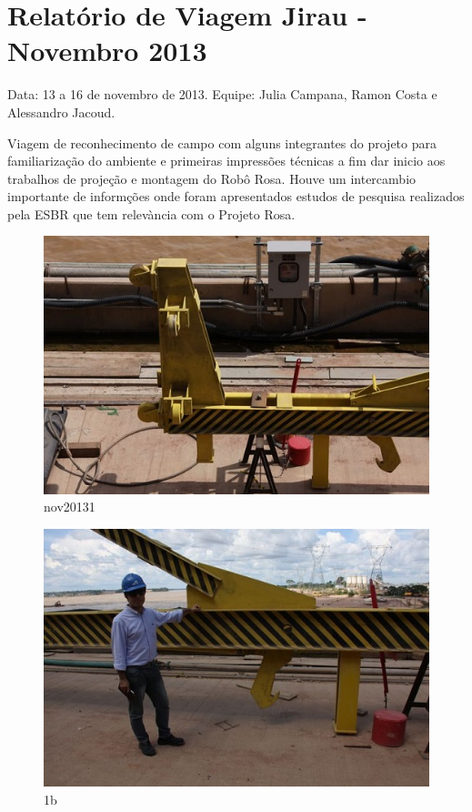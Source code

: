 \section{Relatório de Viagem Jirau - Novembro 2013}
Data: 13 a 16 de novembro de 2013.
Equipe: Julia Campana, Ramon Costa e Alessandro Jacoud.


Viagem de reconhecimento de campo com alguns integrantes do projeto para
familiarização do ambiente e primeiras impressões técnicas a fim dar inicio aos
trabalhos de projeção e montagem do Robô Rosa. Houve um intercambio importante
de informções onde foram apresentados estudos de pesquisa realizados pela ESBR
que tem relevància com o Projeto Rosa.



\begin{figure}[h!]
\centering
  \includegraphics[width=1\linewidth]{Fotos/Novembro2013/1.jpg}
  \caption{nov20131}
  \label{nov20131}
\end{figure}

\begin{figure}[h!]
  \centering
  \includegraphics[width=1\linewidth]{Fotos/Novembro2013/2.jpg}
  \caption{1b}
  \label{nov20132}
\end{figure}

